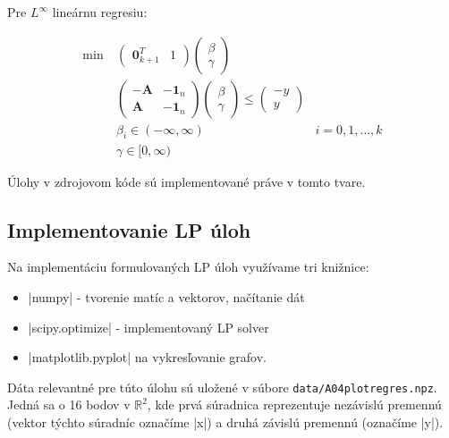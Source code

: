 \documentclass[report.tex]{subfiles}
\begin{document}
Pre $L^{\infty}$ lineárnu regresiu:

\begin{align*}
	\text{min}~ &
	\left(
	\begin{array}{c|c}
		\mathbf{0}_{k+1}^T & 1
	\end{array}
	\right)
	\left(
	\begin{array}{c}
		\beta \\
		\hline
		\gamma
	\end{array}
	\right) \\
	&\left(
	\begin{array}{c|c}
		-\mathbf{A} & -\mathbf{1}_n \\
		\hline
		\mathbf{A} & -\mathbf{1}_n
	\end{array}
	\right)
	\left(
	\begin{array}{c}
		\beta \\
		\hline
		\gamma
	\end{array}
	\right)
	\leq
	\left(
	\begin{array}{c}
		-y \\
		\hline
		y
	\end{array}
	\right) \\
	&\beta_i \in (-\infty, \infty) &i = 0,1,\dots,k\\
	&\gamma \in [0, \infty)
\end{align*}

Úlohy v zdrojovom kóde sú implementované práve v tomto tvare.

\subsection{Implementovanie LP úloh}

Na implementáciu formulovaných LP úloh využívame tri knižnice:

\begin{itemize}
	\item \pyth|numpy| - tvorenie matíc a vektorov, načítanie dát
	\item \pyth|scipy.optimize| - implementovaný LP solver
	\item \pyth|matplotlib.pyplot| na vykresľovanie grafov.
\end{itemize}

Dáta relevantné pre túto úlohu sú uložené v súbore \verb|data/A04plotregres.npz|. Jedná sa o 16 bodov v $\mathbb{R}^2$, kde prvá súradnica reprezentuje nezávislú premennú (vektor týchto súradníc označíme \pyth|x|) a druhá závislú premennú (označíme \pyth|y|). 
\end{document}
